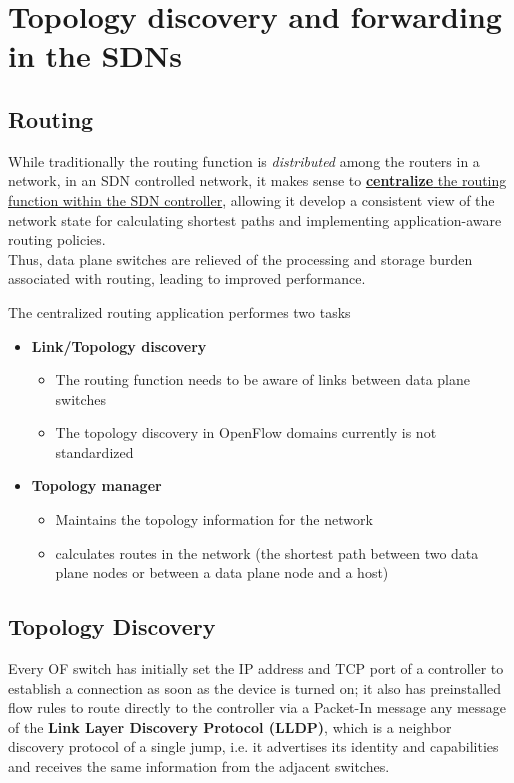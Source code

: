 \section{Topology discovery and forwarding in the SDNs}
\subsection{Routing}
While traditionally the routing function is \textit{distributed} among the routers in a network, in an SDN controlled network, it makes sense to \ul{\textbf{centralize} the routing function within the SDN controller}, allowing it develop a consistent view of the network state for calculating shortest paths and implementing application-aware routing policies.\\
Thus, data plane switches are relieved of the processing and storage burden associated with routing, leading to improved performance.

The centralized routing application performes two tasks
\begin{itemize}
   \item \textbf{Link/Topology discovery}
   \begin{itemize}
      \item The routing function needs to be aware of links between data plane switches
      \item The topology discovery in OpenFlow domains currently is not standardized
   \end{itemize}
   \item \textbf{Topology manager}
   \begin{itemize}
      \item Maintains the topology information for the network
      \item calculates routes in the network (the shortest path between two data plane
      nodes or between a data plane node and a host)
   \end{itemize}
\end{itemize}

\subsection{Topology Discovery}
Every OF switch has initially set the IP address and TCP port of a controller to establish a connection as soon as the device is turned on; it also has preinstalled flow rules to route directly to the controller via a Packet-In message any message of the \textbf{Link Layer Discovery Protocol (LLDP)}, which is a neighbor discovery protocol of a single jump, i.e. it advertises its identity and capabilities and receives the same information from the adjacent switches.

